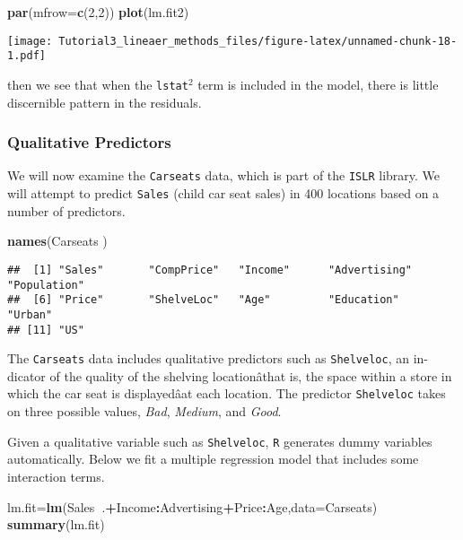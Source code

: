 \documentclass[]{article}
\newenvironment{Shaded}{\begin{snugshade}}{\end{snugshade}}
\newcommand{\KeywordTok}[1]{\textcolor[rgb]{0.13,0.29,0.53}{\textbf{#1}}}
\newcommand{\DataTypeTok}[1]{\textcolor[rgb]{0.13,0.29,0.53}{#1}}
\newcommand{\DecValTok}[1]{\textcolor[rgb]{0.00,0.00,0.81}{#1}}
\newcommand{\OperatorTok}[1]{\textcolor[rgb]{0.81,0.36,0.00}{\textbf{#1}}}
\newcommand{\NormalTok}[1]{#1}
\begin{document}
\begin{Shaded}
\begin{Highlighting}[]
\KeywordTok{par}\NormalTok{(}\DataTypeTok{mfrow=}\KeywordTok{c}\NormalTok{(}\DecValTok{2}\NormalTok{,}\DecValTok{2}\NormalTok{)) }
\KeywordTok{plot}\NormalTok{(lm.fit2)}
\end{Highlighting}
\end{Shaded}

\texttt{[image: Tutorial3\_lineaer\_methods\_files/figure-latex/unnamed-chunk-18-1.pdf]}

then we see that when the \texttt{lstat}\(^2\) term is included in the
model, there is little discernible pattern in the residuals.

\subsubsection{Qualitative Predictors}\label{qualitative-predictors}

We will now examine the \texttt{Carseats} data, which is part of the
\texttt{ISLR} library. We will attempt to predict \texttt{Sales} (child
car seat sales) in 400 locations based on a number of predictors.

\begin{Shaded}
\begin{Highlighting}[]
\KeywordTok{names}\NormalTok{(Carseats )}
\end{Highlighting}
\end{Shaded}

\begin{verbatim}
##  [1] "Sales"       "CompPrice"   "Income"      "Advertising" "Population" 
##  [6] "Price"       "ShelveLoc"   "Age"         "Education"   "Urban"      
## [11] "US"
\end{verbatim}

The \texttt{Carseats} data includes qualitative predictors such as
\texttt{Shelveloc}, an in- dicator of the quality of the shelving
locationâthat is, the space within a store in which the car seat is
displayedâat each location. The predictor \texttt{Shelveloc} takes on
three possible values, \emph{Bad}, \emph{Medium}, and \emph{Good}.

Given a qualitative variable such as \texttt{Shelveloc}, \texttt{R}
generates dummy variables automatically. Below we fit a multiple
regression model that includes some interaction terms.

\begin{Shaded}
\begin{Highlighting}[]
\NormalTok{lm.fit=}\KeywordTok{lm}\NormalTok{(Sales}\OperatorTok{~}\NormalTok{.}\OperatorTok{+}\NormalTok{Income}\OperatorTok{:}\NormalTok{Advertising}\OperatorTok{+}\NormalTok{Price}\OperatorTok{:}\NormalTok{Age,}\DataTypeTok{data=}\NormalTok{Carseats)}
\KeywordTok{summary}\NormalTok{(lm.fit)}
\end{Highlighting}
\end{Shaded}
\end{document}
